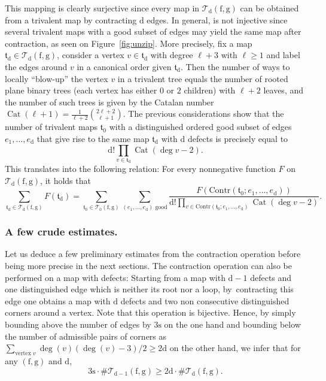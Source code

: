 \documentclass[10pt]{amsart}
\DeclareMathOperator{\Cat}{Cat}
\theoremstyle{plain}
\theoremstyle{definition}
\theoremstyle{remark}
\newcommand{\face}{\mathrm{f}}
\newcommand{\defect}{\mathrm{d}}
\newcommand{\gen}{\mathrm{g}}
\newcommand{\spar}{\mathrm{s}}
\begin{document}
This mapping is clearly surjective since every map in $\mathcal{T}_\defect(\face, \gen)$ can be obtained from a trivalent map by contracting $\defect$ edges. In general, is not injective since several trivalent maps with a good subset of edges may yield the same map after contraction, as seen on Figure~\ref{fig:unzip}.
More precisely, fix a map $\mathfrak{t}_\defect \in \mathcal{T}_\defect(\face, \gen)$, consider a vertex $v \in \mathfrak{t}_\defect$ with degree $\ell+3$ with $\ell \geq 1$ and label the edges around $v$ in a canonical order given $\mathfrak{t}_\defect$. Then the number of ways to locally ``blow-up'' the vertex $v$ in a trivalent tree equals the number of rooted plane binary trees (each vertex has either $0$ or $2$ children) with $\ell+2$ leaves, and the number of such trees is given by the Catalan number $\Cat(\ell+1) = \frac{1}{\ell+2} \binom{2\ell+2}{\ell+1}$. The previous considerations show that the number of trivalent maps $\mathfrak{t}_0$ with a distinguished ordered good subset of edges $e_1, \dots, e_\defect$ that give rise to the same map $\mathfrak{t}_\defect$ with $\defect$ defects is precisely equal to\[
\defect! \prod_{v \in \mathfrak{t}_\defect} \Cat(\deg v - 2).
\]
This translates into the following relation: For every nonnegative function $F$ on $\mathcal{T}_\defect(\face, \gen)$, it holds that
\begin{equation}\label{eq:bijection_defauts}
\sum_{\mathfrak{t}_\defect \in \mathcal{T}_\defect(\face, \gen)} F(\mathfrak{t}_\defect)
= \sum_{\mathfrak{t}_0 \in \mathcal{T}_0(\face, \gen)} \sum_{(e_1, \dots, e_\defect) \text{ good}} \frac{F(\mathrm{Contr}(\mathfrak{t}_0 ; e_1, \dots, e_\defect))}{\defect! \prod_{v \in \mathrm{Contr}(\mathfrak{t}_0 ; e_1, \dots, e_\defect)} \Cat(\deg v - 2)}.
\end{equation}

\subsubsection*{A few crude estimates.}
Let us deduce a few preliminary estimates from the contraction operation before being more precise in the next sections.
The contraction operation can also be performed on a map with defects: Starting from a map with $\defect-1$ defects and one distinguished edge which is neither its root nor a loop, by~contracting this edge one obtains a map with $\defect$ defects and two non consecutive distinguished corners around a vertex. Note that this operation is bijective. Hence, by simply bounding above the number of edges by $3\spar$ on the one hand and bounding below the number of admissible pairs of corners as $\sum_{\textrm{vertex } v} \deg(v) (\deg(v)-3) / 2 \ge 2\defect$ on the other hand, we infer that for any $(\face, \gen)$ and $\defect$,
\begin{equation}\label{eq:crude1}
3 \spar \cdot \# \mathcal{T}_{\defect-1}(\face,\gen) \ge 2 \defect \cdot \# \mathcal{T}_{\defect}(\face,\gen).
\end{equation}
\end{document}
